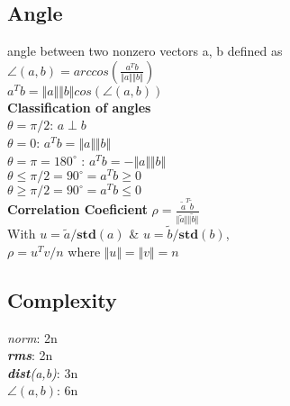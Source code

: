 \subsection{Angle}
angle between two nonzero vectors a, b defined as\\
$\angle(a,b) = arccos(\frac{a^Tb}{\Vert a \Vert \Vert b \Vert})$\\
$a^Tb = \Vert a \Vert \Vert b \Vert cos (\angle(a,b))$\\
\textbf{Classification of angles}\\

$\theta = \pi/2$: $a \perp b$\\
$\theta = 0$: $a^Tb = \Vert a \Vert \Vert b \Vert$\\
$\theta = \pi = 180^{\circ}$ : $a^Tb = -\Vert a \Vert \Vert b\Vert$\\
$\theta \leq \pi/2 = 90^{\circ} = a^Tb \geq 0$\\
$\theta \geq \pi/2 = 90^{\circ} = a^Tb \leq 0$\\
\textbf{Correlation Coeficient}
$\rho = \frac{\tilde{a}^T\tilde{b}}{\Vert\tilde{a}\Vert\Vert\tilde{b}\Vert}$\\
With $u = \tilde{a}/\textbf{std}(a)$ \& $u = \tilde{b}/\textbf{std}(b)$, \\
$\rho = u^Tv/n$ where $\Vert u \Vert = \Vert v \Vert = n$
\subsection{Complexity}
\textbullet \textit{norm}: 2n\\
\textbullet \textit{\textbf{rms}}: 2n\\
\textbullet \textit{\textbf{dist}(a,b)}: 3n\\
\textbullet \textit{$\angle(a,b)$}: 6n\\
